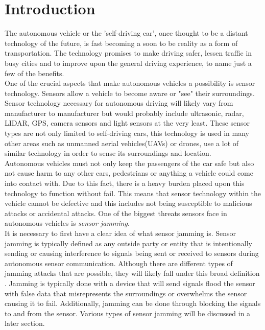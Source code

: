\documentclass[conference]{IEEEtran}
\begin{document}
\section{Introduction}
The autonomous vehicle or the 'self-driving car', once thought to be a distant technology of the future, is fast becoming a soon to be reality as a form of transportation. The technology promises to make driving safer, lessen traffic in busy cities and to improve upon the general driving experience, to name just a few of the benefits. \\
\indent One of the crucial aspects that make autonomous vehicles a possibility is sensor technology. Sensors allow a vehicle to become aware or "see" their surroundings. Sensor technology necessary for autonomous driving will likely vary from manufacturer to manufacturer but would probably include ultrasonic, radar, LIDAR, GPS, camera sensors and light sensors at the very least. These sensor types are not only limited to self-driving cars, this technology is used in many other areas such as unmanned aerial vehicles(UAVs) or drones, use a lot of similar technology in order to sense its surroundings and location. \\
\indent Autonomous vehicles must not only keep the passengers of the car safe but also not cause harm to any other cars, pedestrians or anything a vehicle could come into contact with. Due to this fact, there is a heavy burden placed upon this technology to function without fail. This means that sensor technology within the vehicle cannot be defective and this includes not being susceptible to malicious attacks or accidental attacks. One of the biggest threats sensors face in autonomous vehicles is \textit{sensor jamming}. \\
\indent It is necessary to first have a clear idea of what sensor jamming is. Sensor jamming is typically defined as any outside party or entity that is intentionally sending or causing interference to signals being sent or received to sensors during autonomous sensor communication\cite{2}\cite{7}. Although there are different types of jamming attacks that are possible, they will likely fall under this broad definition \cite{7}. Jamming is typically done with a device that will send signals flood the sensor with false data that misrepresents the surroundings or overwhelms the sensor causing it to fail. Additionally, jamming can be done through blocking the signals to and from the sensor. Various types of sensor jamming will be discussed in a later section.\\
\end{document}
